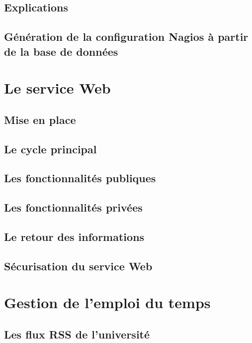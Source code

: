 \subsection{Explications}

\subsection{G\'en\'eration de la configuration Nagios \`a partir de la base de donn\'ees}

\section{Le service Web}

\subsection{Mise en place}

\subsection{Le cycle principal}

\subsection{Les fonctionnalit\'es publiques}

\subsection{Les fonctionnalit\'es priv\'ees}

\subsection{Le retour des informations}

\subsection{S\'ecurisation du service Web}

\section{Gestion de l'emploi du temps}

\subsection{Les flux RSS de l'universit\'e}

